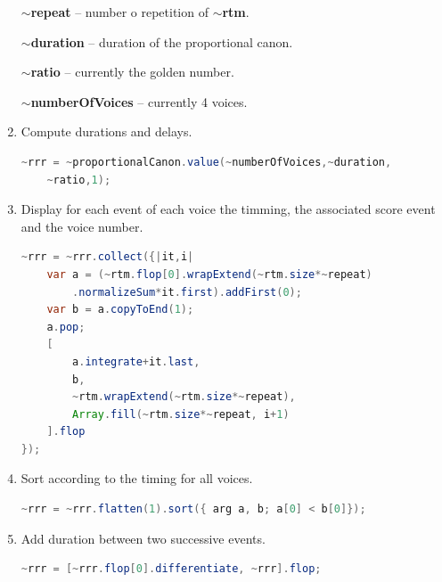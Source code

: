 \begin{enumerate}
\textbf{$\sim$repeat} -- number o repetition of \textbf{$\sim$rtm}.

\textbf{$\sim$duration} -- duration of the proportional canon.

\textbf{$\sim$ratio} -- currently the golden number.

\textbf{$\sim$numberOfVoices} -- currently 4 voices.

 \item Compute durations and delays.
\begin{lstlisting}[basicstyle=\footnotesize\ttfamily,language=Java]
~rrr = ~proportionalCanon.value(~numberOfVoices,~duration,
	~ratio,1);
 \end{lstlisting}
 \item Display for each event of each voice the timming, the associated score event and the voice number.
 \begin{lstlisting}[basicstyle=\footnotesize\ttfamily,language=Java]
~rrr = ~rrr.collect({|it,i|
	var a = (~rtm.flop[0].wrapExtend(~rtm.size*~repeat)
		.normalizeSum*it.first).addFirst(0);
	var b = a.copyToEnd(1);
	a.pop;
	[
		a.integrate+it.last,
		b,
		~rtm.wrapExtend(~rtm.size*~repeat),
		Array.fill(~rtm.size*~repeat, i+1)
	].flop
});
\end{lstlisting}

 \item Sort according to the timing for all voices.
 \begin{lstlisting}[basicstyle=\footnotesize\ttfamily,language=Java]
~rrr = ~rrr.flatten(1).sort({ arg a, b; a[0] < b[0]});
\end{lstlisting}
 \item Add duration between two successive events.
 \begin{lstlisting}[basicstyle=\footnotesize\ttfamily,language=Java]
~rrr = [~rrr.flop[0].differentiate, ~rrr].flop;
\end{lstlisting}

 
 \end{enumerate}
 

